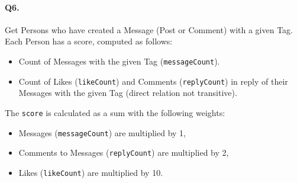 \paragraph{Q6.}
Get Persons who have created a Message (Post or Comment) with a given
Tag.
Each Person has a score, computed as follows:
\begin{itemize}
\tightlist
\item
  Count of Messages with the given Tag (\texttt{messageCount}).
\item
  Count of Likes (\texttt{likeCount}) and Comments (\texttt{replyCount})
  in reply of their Messages with the given Tag (direct relation not
  transitive).
\end{itemize}
The \texttt{score} is calculated as a sum with the following weights:
\begin{itemize}
\tightlist
\item
  Messages (\texttt{messageCount}) are multiplied by 1,
\item
  Comments to Messages (\texttt{replyCount}) are multiplied by 2,
\item
  Likes (\texttt{likeCount}) are multiplied by 10.
\end{itemize}
